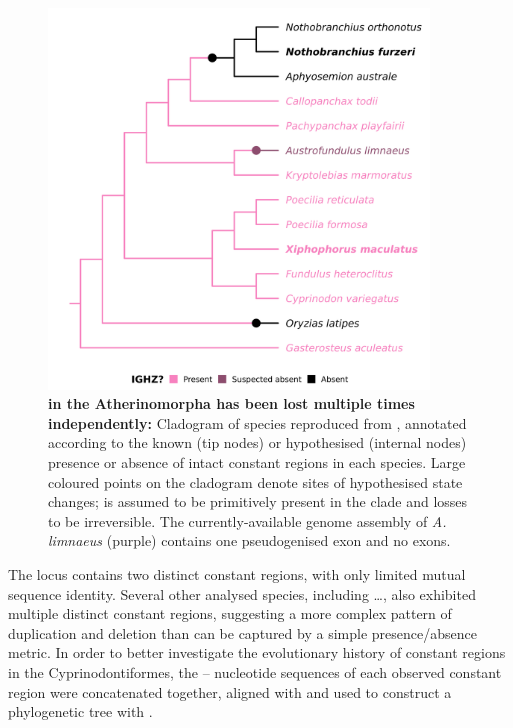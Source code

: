 \begin{figure}
	\centering
	\includegraphics[width=0.9\textwidth]{_Figures/png/species-tree-large-ighz}
	\caption[ in the Atherinomorpha has been lost multiple times independently]{\textbf{ in the Atherinomorpha has been lost multiple times independently:} Cladogram of species reproduced from , annotated according to the known (tip nodes) or hypothesised (internal nodes) presence or absence of intact  constant regions in each species. Large coloured points on the cladogram denote sites of hypothesised state changes;  is assumed to be primitively present in the clade and losses to be irreversible. The currently-available genome assembly of \textit{A. limnaeus} (purple) contains one pseudogenised  exon and no \cz{} exons.}
	\label{fig:species-tree-large-ighz}
\end{figure}

The \Xma \igh{} locus contains two distinct  constant regions, with only limited mutual sequence identity. %
Several other analysed species, including \dots, %
also exhibited multiple distinct  constant regions, suggesting a more complex pattern of  duplication and deletion than can be captured by a simple presence/absence metric. In order to better investigate the evolutionary history of  constant regions in the Cyprinodontiformes, the -- nucleotide sequences of each observed constant region were concatenated together, aligned with  and used to construct a phylogenetic tree with . 

